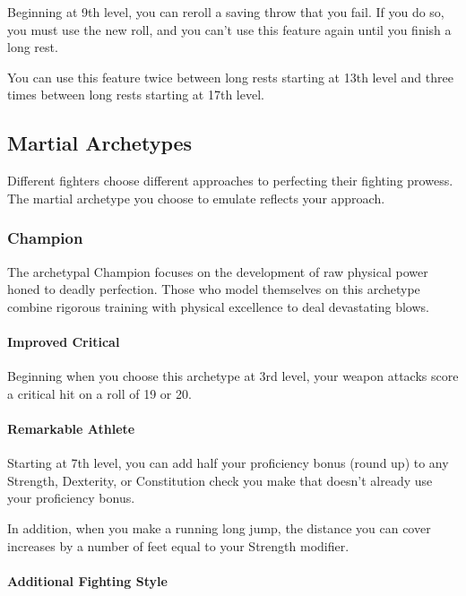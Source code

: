 \documentclass[
]{article}
\begin{document}
Beginning at 9th level, you can reroll a saving throw that you fail. If
you do so, you must use the new roll, and you can't use this feature
again until you finish a long rest.

You can use this feature twice between long rests starting at 13th level
and three times between long rests starting at 17th level.

\hypertarget{martial-archetypes}{%
\subsection{Martial Archetypes}\label{martial-archetypes}}

Different fighters choose different approaches to perfecting their
fighting prowess. The martial archetype you choose to emulate reflects
your approach.

\hypertarget{champion}{%
\subsubsection{Champion}\label{champion}}

The archetypal Champion focuses on the development of raw physical power
honed to deadly perfection. Those who model themselves on this archetype
combine rigorous training with physical excellence to deal devastating
blows.

\hypertarget{improved-critical}{%
\paragraph{Improved Critical}\label{improved-critical}}

Beginning when you choose this archetype at 3rd level, your weapon
attacks score a critical hit on a roll of 19 or 20.

\hypertarget{remarkable-athlete}{%
\paragraph{Remarkable Athlete}\label{remarkable-athlete}}

Starting at 7th level, you can add half your proficiency bonus (round
up) to any Strength, Dexterity, or Constitution check you make that
doesn't already use your proficiency bonus.

In addition, when you make a running long jump, the distance you can
cover increases by a number of feet equal to your Strength modifier.

\hypertarget{additional-fighting-style}{%
\paragraph{Additional Fighting Style}\label{additional-fighting-style}}
\end{document}
